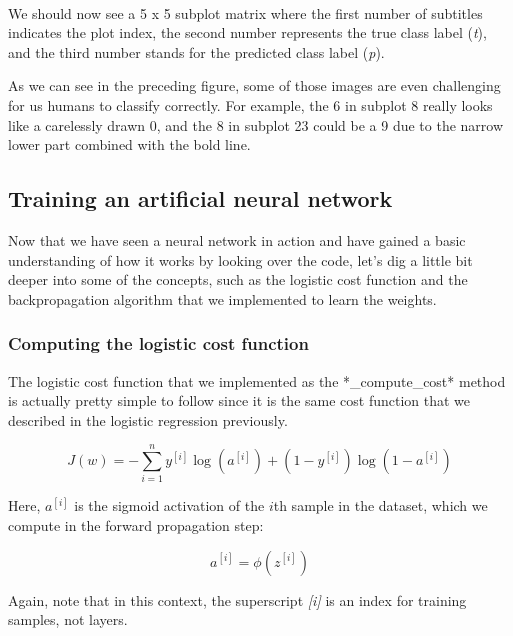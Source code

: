 \documentclass[11pt]{article}
\begin{document}
    \begin{center}
    \end{center}
    { \hspace*{\fill} \\}
    
    We should now see a 5 x 5 subplot matrix where the first number of
subtitles indicates the plot index, the second number represents the
true class label (\emph{t}), and the third number stands for the
predicted class label (\emph{p}).

As we can see in the preceding figure, some of those images are even
challenging for us humans to classify correctly. For example, the 6 in
subplot 8 really looks like a carelessly drawn 0, and the 8 in subplot
23 could be a 9 due to the narrow lower part combined with the bold
line.

    \subsection{Training an artificial neural
network}\label{training-an-artificial-neural-network}

    Now that we have seen a neural network in action and have gained a basic
understanding of how it works by looking over the code, let's dig a
little bit deeper into some of the concepts, such as the logistic cost
function and the backpropagation algorithm that we implemented to learn
the weights.

    \subsubsection{Computing the logistic cost
function}\label{computing-the-logistic-cost-function}

    The logistic cost function that we implemented as the *\_compute\_cost*
method is actually pretty simple to follow since it is the same cost
function that we described in the logistic regression previously.

\[J(w) = -\sum_{i=1}^n y^{[i]}\log(a^{[i]}) + (1 - y^{[i]})\log(1-a^{[i]})\]

Here, \(a^{[i]}\) is the sigmoid activation of the \(i\)th sample in the
dataset, which we compute in the forward propagation step:

\[a^{[i]} = \phi(z^{[i]})\]

Again, note that in this context, the superscript \emph{{[}i{]}} is an
index for training samples, not layers.
\end{document}
